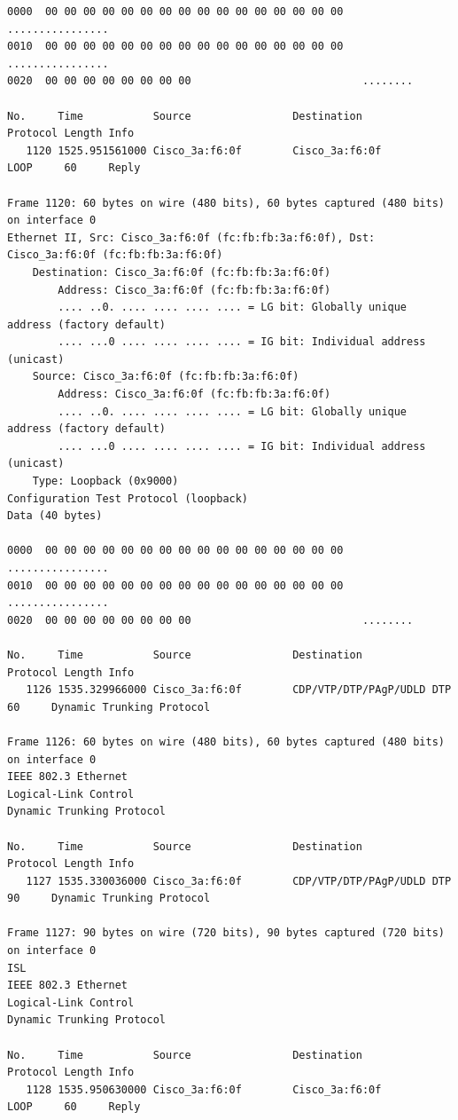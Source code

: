 \documentclass[a4paper,11pt]{article}
\begin{document}
\begin{lstlisting}
0000  00 00 00 00 00 00 00 00 00 00 00 00 00 00 00 00   ................
0010  00 00 00 00 00 00 00 00 00 00 00 00 00 00 00 00   ................
0020  00 00 00 00 00 00 00 00                           ........

No.     Time           Source                Destination           Protocol Length Info
   1120 1525.951561000 Cisco_3a:f6:0f        Cisco_3a:f6:0f        LOOP     60     Reply

Frame 1120: 60 bytes on wire (480 bits), 60 bytes captured (480 bits) on interface 0
Ethernet II, Src: Cisco_3a:f6:0f (fc:fb:fb:3a:f6:0f), Dst: Cisco_3a:f6:0f (fc:fb:fb:3a:f6:0f)
    Destination: Cisco_3a:f6:0f (fc:fb:fb:3a:f6:0f)
        Address: Cisco_3a:f6:0f (fc:fb:fb:3a:f6:0f)
        .... ..0. .... .... .... .... = LG bit: Globally unique address (factory default)
        .... ...0 .... .... .... .... = IG bit: Individual address (unicast)
    Source: Cisco_3a:f6:0f (fc:fb:fb:3a:f6:0f)
        Address: Cisco_3a:f6:0f (fc:fb:fb:3a:f6:0f)
        .... ..0. .... .... .... .... = LG bit: Globally unique address (factory default)
        .... ...0 .... .... .... .... = IG bit: Individual address (unicast)
    Type: Loopback (0x9000)
Configuration Test Protocol (loopback)
Data (40 bytes)

0000  00 00 00 00 00 00 00 00 00 00 00 00 00 00 00 00   ................
0010  00 00 00 00 00 00 00 00 00 00 00 00 00 00 00 00   ................
0020  00 00 00 00 00 00 00 00                           ........

No.     Time           Source                Destination           Protocol Length Info
   1126 1535.329966000 Cisco_3a:f6:0f        CDP/VTP/DTP/PAgP/UDLD DTP      60     Dynamic Trunking Protocol

Frame 1126: 60 bytes on wire (480 bits), 60 bytes captured (480 bits) on interface 0
IEEE 802.3 Ethernet 
Logical-Link Control
Dynamic Trunking Protocol

No.     Time           Source                Destination           Protocol Length Info
   1127 1535.330036000 Cisco_3a:f6:0f        CDP/VTP/DTP/PAgP/UDLD DTP      90     Dynamic Trunking Protocol

Frame 1127: 90 bytes on wire (720 bits), 90 bytes captured (720 bits) on interface 0
ISL
IEEE 802.3 Ethernet 
Logical-Link Control
Dynamic Trunking Protocol

No.     Time           Source                Destination           Protocol Length Info
   1128 1535.950630000 Cisco_3a:f6:0f        Cisco_3a:f6:0f        LOOP     60     Reply


\end{lstlisting}
\end{document}
